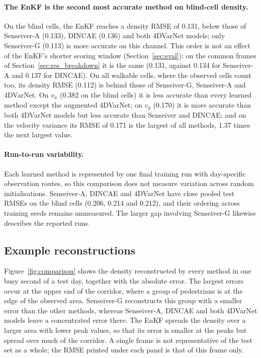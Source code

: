 \documentclass[english, 12pt, a4paper, elec, utf8, a-2b, online]{aaltothesis}
\begin{document}
\paragraph{The EnKF is the second most accurate method on blind-cell density.}
On the blind cells, the EnKF reaches a density RMSE of 0.131, below those of
Senseiver\nobreakdash-A (0.133), DINCAE (0.136) and both 4DVarNet models; only Senseiver\nobreakdash-G
(0.113) is more accurate on this channel. This order is not an effect of the
EnKF's shorter scoring window (Section~\ref{sec:eval}): on the common frames of
Section~\ref{sec:res_breakdown} it is the same (0.131, against 0.134 for
Senseiver\nobreakdash-A and 0.137 for DINCAE). On all walkable cells, where the observed
cells count too, its density RMSE (0.112) is behind those of Senseiver\nobreakdash-G,
Senseiver\nobreakdash-A and 4DVarNet. On $v_x$ (0.382 on the blind cells) it is less
accurate than every learned method except the augmented 4DVarNet; on $v_y$
(0.170) it is more accurate than both 4DVarNet models but less accurate than
Senseiver and DINCAE; and on the velocity variance its RMSE of 0.171 is the
largest of all methods, 1.37 times the next largest value.

\paragraph{Run-to-run variability.}
Each learned method is represented by one final training run with
day-specific observation routes, so this comparison does not measure
variation across random initialisations. Senseiver\nobreakdash-A, DINCAE and 4DVarNet
have close pooled test RMSEs on the blind cells (0.206, 0.214 and 0.212), and their ordering across
training seeds remains unmeasured. The larger gap involving Senseiver\nobreakdash-G
likewise describes the reported runs.

\subsection{Example reconstructions}
\label{sec:res_example}

Figure~\ref{fig:comparison} shows the density reconstructed by every method in
one busy second of a test day, together with the absolute error. The
largest errors occur at the upper end of the corridor, where a group of
pedestrians is at the edge of the observed area. Senseiver\nobreakdash-G reconstructs
this group with a smaller error than the other methods, whereas Senseiver\nobreakdash-A, DINCAE and both 4DVarNet models leave a concentrated error there. The EnKF spreads the density over a
larger area with lower peak values, so that its error is smaller at the peaks
but spread over much of the corridor.
A single frame is not representative of the test set as a whole; the RMSE
printed under each panel is that of this frame only.
\end{document}

